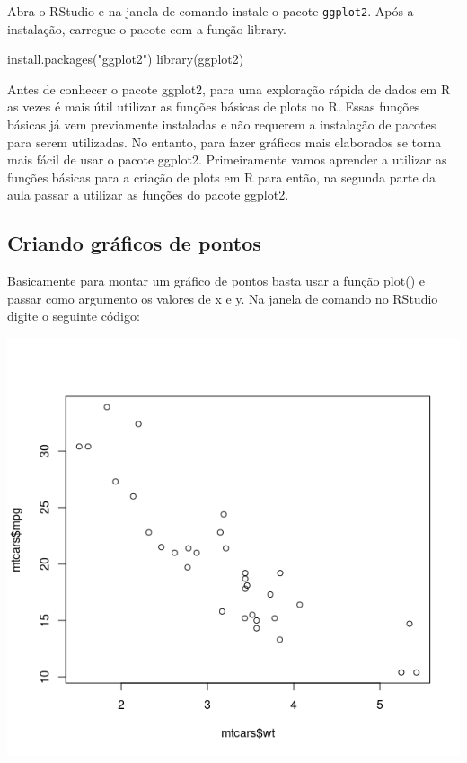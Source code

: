 \documentclass[
]{book}
\newenvironment{Shaded}{\begin{snugshade}}{\end{snugshade}}
\newcommand{\FunctionTok}[1]{\textcolor[rgb]{0.00,0.00,0.00}{#1}}
\newcommand{\NormalTok}[1]{#1}
\newcommand{\SpecialCharTok}[1]{\textcolor[rgb]{0.00,0.00,0.00}{#1}}
\newcommand{\StringTok}[1]{\textcolor[rgb]{0.31,0.60,0.02}{#1}}
\begin{document}
Abra o RStudio e na janela de comando instale o pacote \texttt{ggplot2}. Após a instalação, carregue o pacote com a função library.

\begin{Shaded}
\begin{Highlighting}[]
\FunctionTok{install.packages}\NormalTok{(}\StringTok{"ggplot2"}\NormalTok{)}
\FunctionTok{library}\NormalTok{(ggplot2)}
\end{Highlighting}
\end{Shaded}

Antes de conhecer o pacote ggplot2, para uma exploração rápida de dados em R as vezes é mais útil utilizar as funções básicas de plots no R. Essas funções básicas já vem previamente instaladas e não requerem a instalação de pacotes para serem utilizadas. No entanto, para fazer gráficos mais elaborados se torna mais fácil de usar o pacote ggplot2. Primeiramente vamos aprender a utilizar as funções básicas para a criação de plots em R para então, na segunda parte da aula passar a utilizar
as funções do pacote ggplot2.

\hypertarget{criando-gruxe1ficos-de-pontos}{%
\subsection{Criando gráficos de pontos}\label{criando-gruxe1ficos-de-pontos}}

Basicamente para montar um gráfico de pontos basta usar a função plot() e passar como argumento os valores de x e y. Na janela de comando no RStudio digite o seguinte código:

\begin{Shaded}
\end{Shaded}

\includegraphics{figure/g1.png}
\end{document}
